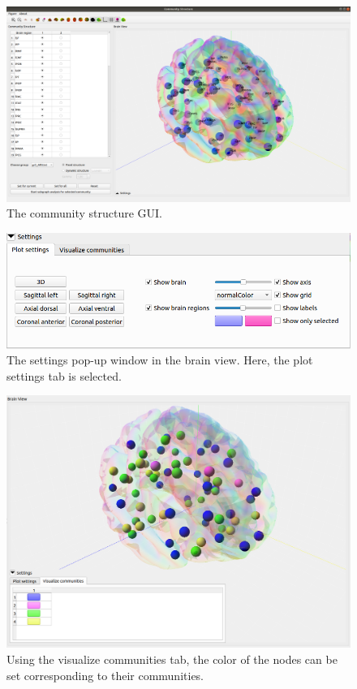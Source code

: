 \documentclass{article}
\begin{document}
\begin{figure}[h]
    \centering
    \includegraphics[width=\linewidth]{community_structure.png}
    \caption{The community structure GUI.}
    \label{fig:community}
\end{figure}

\begin{figure}[h]
    \centering
    \includegraphics[width=\linewidth]{plot_settings.png}
    \caption{The settings pop-up window in the brain view. Here, the plot settings tab is selected.}
    \label{fig:plot_settings}
\end{figure}

\begin{figure}[h]
    \centering
    \includegraphics[width=\linewidth]{visualize_communities.png}
    \caption{Using the visualize communities tab, the color of the nodes can be set corresponding to their communities.}
    \label{fig:vis_com}
\end{figure}
\end{document}
